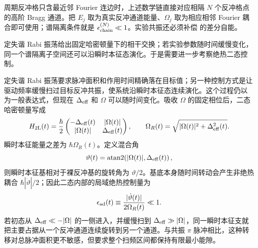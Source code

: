周期反冲格只含最近邻 Fourier 连边时，上述数学链直接对应相隔 $N$ 个反冲格点的高阶 Bragg 通道。把 $E_j$ 取为真实反冲通道能量、$\Omega_j$ 取为相应相邻 Fourier 耦合即可使用；谱隔离条件就是 $\epsilon_{\rm chain}^{(N)}\ll1$。实验共振还必须补偿 的差分自能。




定失谐 Rabi 振荡给出固定哈密顿量下的相干交换；若实验参数随时间缓慢变化，同一个谱隔离子空间还可以沿瞬时本征态演化。于是需要进一步考察绝热二态控制。

定失谐 Rabi 振荡要求脉冲面积和作用时间精确落在目标值；另一种控制方式是让驱动频率缓慢扫过目标反冲共振，使系统沿瞬时本征态连续演化。这个过程仍以 为一般表达式，但现在 $\Delta_{\rm eff}$ 和 $\Omega$ 可以随时间变化。吸收 $\Omega$ 的固定相位后，二态哈密顿量写成
\begin{equation}
 H_{2\rm L}(t)
 =\frac{\hbar}{2}
 \begin{pmatrix}
 -\Delta_{\rm eff}(t)&|\Omega(t)|\\
 |\Omega(t)|&\Delta_{\rm eff}(t)
 \end{pmatrix},
 \qquad
 \Omega_R(t)=\sqrt{|\Omega(t)|^2+\Delta_{\rm eff}^2(t)}.
 \label{eq:recoil-adiabatic-twolevel-dp32}
\end{equation}
瞬时本征能量之差为 $\hbar\Omega_R(t)$。定义混合角
\begin{equation*}
 \vartheta(t)=\operatorname{atan2}\!\left(|\Omega(t)|,\Delta_{\rm eff}(t)\right),
\end{equation*}
则瞬时本征基相对于裸反冲基的旋转角为 $\vartheta/2$。基底本身随时间转动会产生非绝热耦合 $\hbar|\dot\vartheta|/2$；因此二态内部的局域绝热控制量为
\begin{equation}
 {
 \epsilon_{\rm ad}(t)
 \equiv\frac{|\dot\vartheta(t)|}{2\Omega_R(t)}\ll1.}
 \label{eq:recoil-adiabatic-criterion-dp32}
\end{equation}
若初态从 $\Delta_{\rm eff}\ll-|\Omega|$ 的一侧进入，并缓慢扫到 $\Delta_{\rm eff}\gg|\Omega|$，同一瞬时本征支就把主要占据从一个反冲通道连续旋转到另一个通道。与共振 $\pi$ 脉冲相比，这种转移对总脉冲面积更不敏感，但要求整个扫频区间都保持有限最小能隙。

